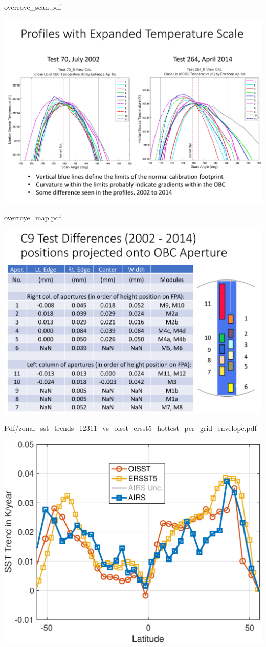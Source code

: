 \documentclass[presentation]{beamer}
\begin{document}
\begin{frame}[label={sec:org7886108}]{overroye\_scan.pdf}
\begin{center}
\includegraphics[width=0.7\linewidth]{./Figs/Pdf/overroye_scan.pdf}
\end{center}
\end{frame}

\begin{frame}[label={sec:orgb4881da}]{overroye\_map.pdf}
\begin{center}
\includegraphics[width=0.7\linewidth]{./Figs/Pdf/overroye_map.pdf}
\end{center}
\end{frame}





\begin{frame}[label={sec:org6a2d241}]{Pdf/zonal\_sst\_trends\_12311\_vs\_oisst\_ersst5\_hottest\_per\_grid\_envelope.pdf}
\begin{center}
\includegraphics[width=0.7\linewidth]{./Figs/Pdf/zonal_sst_trends_12311_vs_oisst_ersst5_hottest_per_grid_envelope.pdf}
\end{center}
\end{frame}
\end{document}
